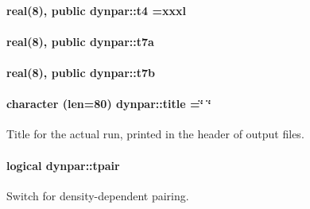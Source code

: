 \paragraph[{\texorpdfstring{t4}{t4}}]{\setlength{\rightskip}{0pt plus 5cm}real(8), public dynpar\+::t4 =xxxl}\hypertarget{namespacedynpar_afba19ad7aa265b1118bb2717342c26c1}{}\label{namespacedynpar_afba19ad7aa265b1118bb2717342c26c1}
\paragraph[{\texorpdfstring{t7a}{t7a}}]{\setlength{\rightskip}{0pt plus 5cm}real(8), public dynpar\+::t7a}\hypertarget{namespacedynpar_abb0f2830794bbbf63ad3e66d51efd586}{}\label{namespacedynpar_abb0f2830794bbbf63ad3e66d51efd586}
\paragraph[{\texorpdfstring{t7b}{t7b}}]{\setlength{\rightskip}{0pt plus 5cm}real(8), public dynpar\+::t7b}\hypertarget{namespacedynpar_a854df581a7d115b4efe0c4b8c1ef2b2a}{}\label{namespacedynpar_a854df581a7d115b4efe0c4b8c1ef2b2a}
\paragraph[{\texorpdfstring{title}{title}}]{\setlength{\rightskip}{0pt plus 5cm}character (len=80) dynpar\+::title =\char`\"{} \char`\"{}}\hypertarget{namespacedynpar_a8f17285d0a850123850dacf83f3c7ee7}{}\label{namespacedynpar_a8f17285d0a850123850dacf83f3c7ee7}


Title for the actual run, printed in the header of output files. 

\paragraph[{\texorpdfstring{tpair}{tpair}}]{\setlength{\rightskip}{0pt plus 5cm}logical dynpar\+::tpair}\hypertarget{namespacedynpar_ae803e7e68e03a3afec51fc221aec9378}{}\label{namespacedynpar_ae803e7e68e03a3afec51fc221aec9378}


Switch for density-\/dependent pairing. 

